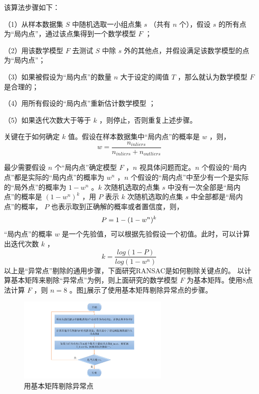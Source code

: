 该算法步骤如下：

（1）从样本数据集 $S$ 中随机选取一小组点集 $s$ （共有 $n$ 个），假设 $s$  的所有点为“局内点”，通过该点集得到一个数学模型 $F$ ；

（2）用该数学模型 $F$ 去测试 $S$ 中除 $s$ 外的其他点，并假设满足该数学模型的点为“局内点”；

（3）如果被假设为“局内点”的数量 $n$ 大于设定的阈值 $T$ ，那么就认为数学模型 $F$ 是合理的；

（4）用所有假设的“局内点”重新估计数学模型 ；

（5）如果迭代次数大于等于 $k$ ，则停止，否则重复上述步骤。

关键在于如何确定 $k$ 值。假设在样本数据集中“局内点”的概率是 $w $ ，则，
\begin{equation}
\label{eqn:3.10}
w = \frac{n_{inliers}}{n_{inliers} + n_{outliers}}
\end{equation}

最少需要假设 $n$ 个“局内点”确定模型 $F$ ，$n$ 视具体问题而定。$n$ 个假设的“局内点”都是实际的“局内点”的概率为 $w^n$ ，$n$ 个假设的“局内点”中至少有一个是实际的“局外点”的概率为 $1-w^n $ 。$k$ 次随机选取的点集 $s$ 中没有一次全部是“局内点”的概率是 $(1-w^n)^k $ ，用  $P$ 表示 $k$ 次随机选取的点集 $s$  中全部都是“局内点”的概率， $P$ 也表示取到正确解的概率或者置信度，则，
\begin{equation}
\label{eqn:3.11}
\setlength{\abovedisplayskip}{6pt}
\setlength{\belowdisplayskip}{6pt}
P=1-(1-w^n)^k
\end{equation}
“局内点”的概率 $w$  是一个先验值，可以根据先验假设一个初值。此时，可以计算出迭代次数 $k$  ，
\begin{equation}
\label{eqn:3.12}
k = \frac{log(1-P)}{log(1-w^n)}
\end{equation}
以上是“异常点”剔除的通用步骤，下面研究RANSAC是如何剔除关键点的。
以计算基本矩阵来剔除“异常点”为例，则上面研究的数学模型 $F$ 为基本矩阵。使用8点法计算 $F $ ，则 $n=8$ 。图\ref{fig3_5}展示了使用基本矩阵剔除异常点的步骤。
\begin{figure}[h]\setlength{\belowcaptionskip}{-12pt}
	\centering
	\includegraphics[width=0.65\textwidth]{figures/chapter3/fig3_5}
	\caption{用基本矩阵剔除异常点}\label{fig3_5}
\end{figure}

